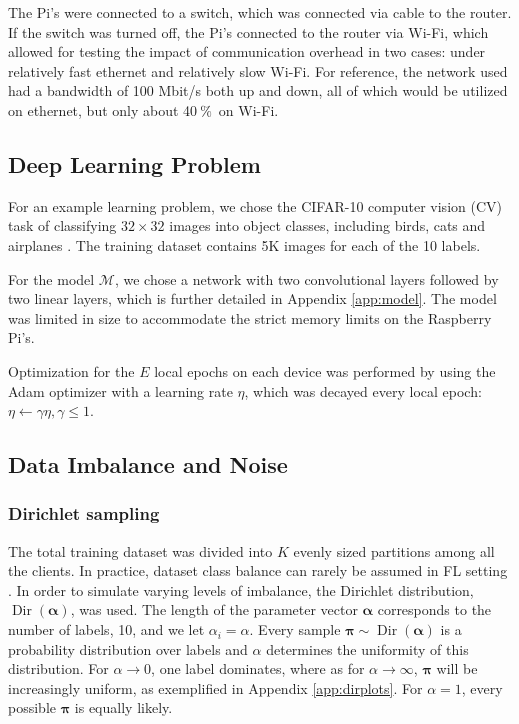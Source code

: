 \documentclass{article}
\newcommand{\unit}[1]{\ensuremath{\:\text{#1}}}
\newcommand{\pro}{\ensuremath{\unit{\%{}}}}
\begin{document}
The Pi's were connected to a switch, which was connected via cable to the router.
If the switch was turned off, the Pi's connected to the router via Wi-Fi, which allowed for testing the impact of communication overhead in two cases: under relatively fast ethernet and relatively slow Wi-Fi.
For reference, the network used had a bandwidth of 100 Mbit/s both up and down, all of which would be utilized on ethernet, but only about 40\pro\ on Wi-Fi.

\subsection{Deep Learning Problem}
For an example learning problem, we chose the CIFAR-10 computer vision (CV) task of classifying $32\times 32$ images into object classes, including birds, cats and airplanes \cite{alex2009learning}.
The training dataset contains 5K images for each of the 10 labels.

For the model $\mathcal M$, we chose a network with two convolutional layers followed by two linear layers, which is further detailed in Appendix \ref{app:model}.
The model was limited in size to accommodate the strict memory limits on the Raspberry Pi's.

Optimization for the $E$ local epochs on each device was performed by using the Adam optimizer \cite{kingma2015adam} with a learning rate $\eta$, which was decayed every local epoch: $\eta\leftarrow\gamma\eta, \gamma\le 1$.

\subsection{Data Imbalance and Noise}
\subsubsection{Dirichlet sampling}
The total training dataset was divided into $K$ evenly sized partitions among all the clients.
In practice, dataset class balance can rarely be assumed in FL setting \cite{kai2021advances}.
In order to simulate varying levels of imbalance, the Dirichlet distribution, $\operatorname{Dir}(\bm\alpha)$, was used.
The length of the parameter vector  $\bm\alpha$ corresponds to the number of labels, 10, and we let $\alpha_i=\alpha$.
Every sample $\bm\pi\sim\operatorname{Dir}(\bm\alpha)$ is a probability distribution over labels and $\alpha$ determines the uniformity of this distribution.
For $\alpha\to0$, one label dominates, where as for $\alpha\to\infty$, $\bm\pi$ will be increasingly uniform, as exemplified in Appendix \ref{app:dirplots}.
For $\alpha=1$, every possible $\bm\pi$ is equally likely.
\end{document}
